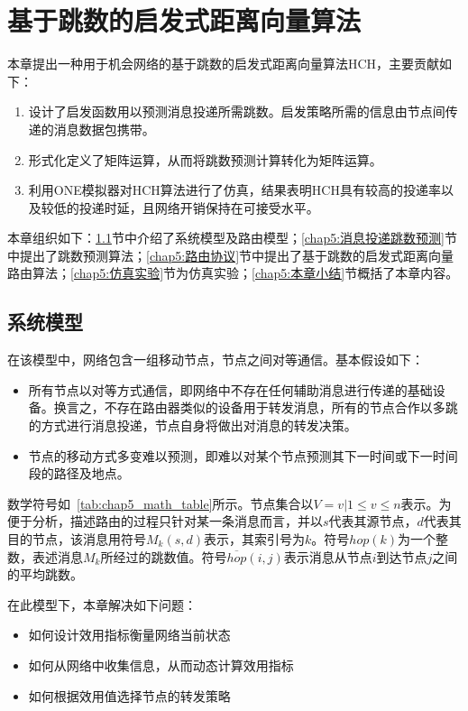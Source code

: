 \chapter{基于跳数的启发式距离向量算法}

本章提出一种用于机会网络的基于跳数的启发式距离向量算法HCH，主要贡献如下：

\begin{enumerate}
\item 设计了启发函数用以预测消息投递所需跳数。启发策略所需的信息由节点间传递的消息数据包携带。
\item 形式化定义了矩阵运算，从而将跳数预测计算转化为矩阵运算。
\item 利用ONE模拟器对HCH算法进行了仿真，结果表明HCH具有较高的投递率以及较低的投递时延，且网络开销保持在可接受水平。
\end{enumerate}

本章组织如下：\ref{chap5:系统模型}节中介绍了系统模型及路由模型；\ref{chap5:消息投递跳数预测}节中提出了跳数预测算法；\ref{chap5:路由协议}节中提出了基于跳数的启发式距离向量路由算法；\ref{chap5:仿真实验}节为仿真实验；\ref{chap5:本章小结}节概括了本章内容。


\section{系统模型}
\label{chap5:系统模型}

在该模型中，网络包含一组移动节点，节点之间对等通信。基本假设如下：
\begin{itemize}
\item 所有节点以对等方式通信，即网络中不存在任何辅助消息进行传递的基础设备。换言之，不存在路由器类似的设备用于转发消息，所有的节点合作以多跳的方式进行消息投递，节点自身将做出对消息的转发决策。
\item 节点的移动方式多变难以预测，即难以对某个节点预测其下一时间或下一时间段的路径及地点。
\end{itemize}

数学符号如\tablename~\ref{tab:chap5_math_table}所示。节点集合以$V={v|1\leq v\leq n}$表示。为便于分析，描述路由的过程只针对某一条消息而言，并以$s$代表其源节点，$d$代表其目的节点，该消息用符号$M_k(s,d)$表示，其索引号为$k$。符号$hop(k)$为一个整数，表述消息$M_k$所经过的跳数值。符号$\overline{hop}(i,j)$表示消息从节点$i$到达节点$j$之间的平均跳数。

在此模型下，本章解决如下问题：
\begin{itemize}
\item 如何设计效用指标衡量网络当前状态
\item 如何从网络中收集信息，从而动态计算效用指标
\item 如何根据效用值选择节点的转发策略
\end{itemize}



